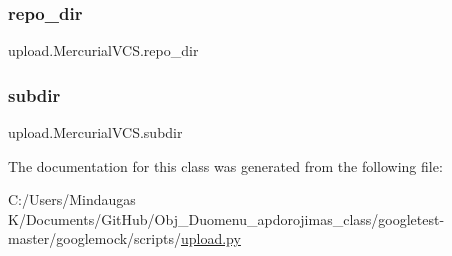 \subsubsection{\texorpdfstring{repo\_dir}{repo\_dir}}
{\footnotesize\ttfamily upload.\+Mercurial\+V\+C\+S.\+repo\+\_\+dir}

\mbox{\label{classupload_1_1_mercurial_v_c_s_a0dad32e621f5523e3430d867184f0b42}} 
\subsubsection{\texorpdfstring{subdir}{subdir}}
{\footnotesize\ttfamily upload.\+Mercurial\+V\+C\+S.\+subdir}



The documentation for this class was generated from the following file\+:\begin{DoxyCompactItemize}
\item 
C\+:/\+Users/\+Mindaugas K/\+Documents/\+Git\+Hub/\+Obj\+\_\+\+Duomenu\+\_\+apdorojimas\+\_\+class/googletest-\/master/googlemock/scripts/\mbox{\hyperlink{googletest-master_2googlemock_2scripts_2upload_8py}{upload.\+py}}\end{DoxyCompactItemize}
